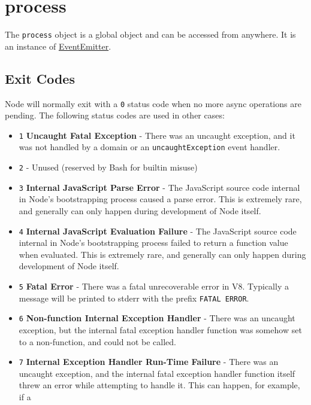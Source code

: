 \section{process}

The \texttt{process} object is a global object and can be accessed from
anywhere. It is an instance of
\href{events.html\#events\_class\_events\_eventemitter}{EventEmitter}.

\subsection{Exit Codes}

Node will normally exit with a \texttt{0} status code when no more async
operations are pending. The following status codes are used in other
cases:

\begin{itemize}
\item
  \texttt{1} \textbf{Uncaught Fatal Exception} - There was an uncaught
  exception, and it was not handled by a domain or an
  \texttt{uncaughtException} event handler.
\item
  \texttt{2} - Unused (reserved by Bash for builtin misuse)
\item
  \texttt{3} \textbf{Internal JavaScript Parse Error} - The JavaScript
  source code internal in Node's bootstrapping process caused a parse
  error. This is extremely rare, and generally can only happen during
  development of Node itself.
\item
  \texttt{4} \textbf{Internal JavaScript Evaluation Failure} - The
  JavaScript source code internal in Node's bootstrapping process failed
  to return a function value when evaluated. This is extremely rare, and
  generally can only happen during development of Node itself.
\item
  \texttt{5} \textbf{Fatal Error} - There was a fatal unrecoverable
  error in V8. Typically a message will be printed to stderr with the
  prefix \texttt{FATAL   ERROR}.
\item
  \texttt{6} \textbf{Non-function Internal Exception Handler} - There
  was an uncaught exception, but the internal fatal exception handler
  function was somehow set to a non-function, and could not be called.
\item
  \texttt{7} \textbf{Internal Exception Handler Run-Time Failure} -
  There was an uncaught exception, and the internal fatal exception
  handler function itself threw an error while attempting to handle it.
  This can happen, for example, if a

\end{itemize}
